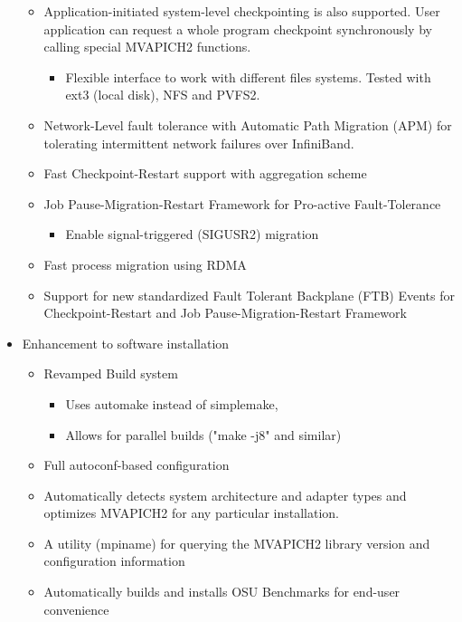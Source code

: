 \begin{itemize}
\begin{itemize}
      \item  Application-initiated system-level checkpointing is
      also supported. User application can request a whole program
      checkpoint synchronously by calling special MVAPICH2 functions.
        \begin{itemize} \item  Flexible interface to work with different files
	systems. Tested with ext3 (local disk), NFS and PVFS2. 
	\end{itemize}
      \item  Network-Level fault tolerance with Automatic Path
      Migration (APM) for tolerating intermittent network failures
      over InfiniBand. 
      \item  Fast Checkpoint-Restart support with aggregation scheme
      \item  Job Pause-Migration-Restart Framework for Pro-active Fault-Tolerance
           \begin{itemize}
            \item  Enable signal-triggered (SIGUSR2) migration
           \end{itemize}
      \item  Fast process migration using RDMA
      \item  Support for new standardized Fault Tolerant Backplane (FTB) Events
	   for Checkpoint-Restart and Job Pause-Migration-Restart Framework
    \end{itemize}
  \item  Enhancement to software installation
      \begin{itemize}  
        \item Revamped Build system
        \begin {itemize}
            \item  Uses automake instead of simplemake,
            \item  Allows for parallel builds ("make -j8" and similar)
        \end{itemize}
       \item  Full autoconf-based configuration
       \item  Automatically
      detects system architecture and adapter types and
      optimizes MVAPICH2 for any particular installation.
       \item  A utility (mpiname) for querying the MVAPICH2 
            library version and configuration information
	    \item  Automatically builds and installs OSU Benchmarks for end-user convenience

\end{itemize}
\end{itemize}
